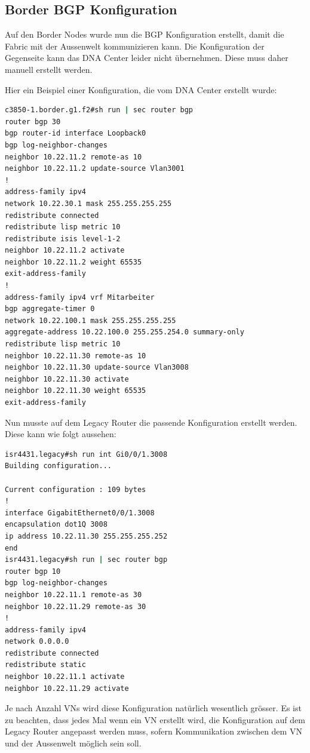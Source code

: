 \subsection{Border BGP Konfiguration}

Auf den Border Nodes wurde nun die BGP Konfiguration erstellt, damit die Fabric mit der Aussenwelt kommunizieren kann. Die Konfiguration der Gegenseite kann das DNA Center leider nicht übernehmen. Diese muss daher manuell erstellt werden.

Hier ein Beispiel einer Konfiguration, die vom DNA Center erstellt wurde:

\begin{lstlisting}[language=bash]
c3850-1.border.g1.f2#sh run | sec router bgp
router bgp 30
bgp router-id interface Loopback0
bgp log-neighbor-changes
neighbor 10.22.11.2 remote-as 10
neighbor 10.22.11.2 update-source Vlan3001
!
address-family ipv4
network 10.22.30.1 mask 255.255.255.255
redistribute connected
redistribute lisp metric 10
redistribute isis level-1-2
neighbor 10.22.11.2 activate
neighbor 10.22.11.2 weight 65535
exit-address-family
!
address-family ipv4 vrf Mitarbeiter
bgp aggregate-timer 0
network 10.22.100.1 mask 255.255.255.255
aggregate-address 10.22.100.0 255.255.254.0 summary-only
redistribute lisp metric 10
neighbor 10.22.11.30 remote-as 10
neighbor 10.22.11.30 update-source Vlan3008
neighbor 10.22.11.30 activate
neighbor 10.22.11.30 weight 65535
exit-address-family
\end{lstlisting}

Nun musste auf dem Legacy Router die passende Konfiguration erstellt werden. Diese kann wie folgt aussehen:

\begin{lstlisting}[language=bash]
isr4431.legacy#sh run int Gi0/0/1.3008
Building configuration...

Current configuration : 109 bytes
!
interface GigabitEthernet0/0/1.3008
encapsulation dot1Q 3008
ip address 10.22.11.30 255.255.255.252
end
isr4431.legacy#sh run | sec router bgp
router bgp 10
bgp log-neighbor-changes
neighbor 10.22.11.1 remote-as 30
neighbor 10.22.11.29 remote-as 30
!
address-family ipv4
network 0.0.0.0
redistribute connected
redistribute static
neighbor 10.22.11.1 activate
neighbor 10.22.11.29 activate
\end{lstlisting}

Je nach Anzahl VNs wird diese Konfiguration natürlich wesentlich grösser. Es ist zu beachten, dass jedes Mal wenn ein VN erstellt wird, die Konfiguration auf dem Legacy Router angepasst werden muss, sofern Kommunikation zwischen dem VN und der Aussenwelt möglich sein soll.

